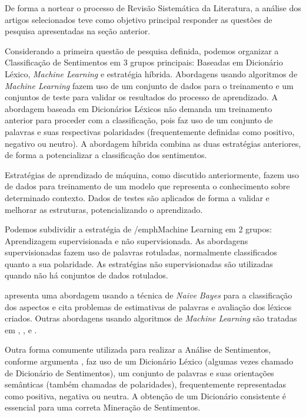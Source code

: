 \documentclass[12pt]{article}
\begin{document}
De forma a nortear o processo de Revisão Sistemática da Literatura, a análise dos artigos selecionados teve como objetivo principal responder as questões de pesquisa apresentadas na seção anterior. 

Considerando a primeira questão de pesquisa definida, podemos organizar a Classificação de Sentimentos em 3 grupos principais: Baseadas em Dicionário Léxico, \emph{Machine Learning} e estratégia híbrida. Abordagens usando algoritmos de \emph{Machine Learning} fazem uso de um conjunto de dados para o treinamento e um conjuntos de teste para validar os resultados do processo de aprendizado. A abordagem baseada em Dicionários Léxicos não demanda um treinamento anterior para proceder com a classificação, pois faz uso de um conjunto de palavras e suas respectivas polaridades (frequentemente definidas como positivo, negativo ou neutro). A abordagem híbrida combina as duas estratégias anteriores, de forma a potencializar a classificação dos sentimentos.

Estratégias de aprendizado de máquina, como discutido anteriormente, fazem uso de dados para treinamento de um modelo que representa o conhecimento sobre determinado contexto. Dados de testes são aplicados de forma a validar e melhorar as estruturas, potencializando o aprendizado. 

Podemos subdividir a estratégia de /emph{Machine Learning} em 2 grupos: Aprendizagem supervisionada e não supervisionada. As abordagens supervisionadas fazem uso de palavras rotuladas, normalmente classificados quanto a sua polaridade. As estratégias não supervisionadas são utilizadas quando não há conjuntos de dados rotulados.

\cite{eisenstein2016unsupervised} apresenta uma abordagem usando a técnica de \emph{Naive Bayes} para a classificação dos aspectos e cita problemas de estimativas de palavras e avaliação dos léxicos criados. Outras abordagens usando algoritmos de \emph{Machine Learning} são tratadas em \cite{gilbert2014vader}, \cite{HADDI2013}, \cite{ALGAAL} e \cite{taboada2011lexicon}.

Outra forma comumente utilizada para realizar a Análise de Sentimentos, conforme argumenta \cite{kdir16}, faz uso de um Dicionário Léxico (algumas vezes chamado de Dicionário de Sentimentos), um conjunto de palavras e suas orientações semânticas (também chamadas de polaridades), frequentemente representadas como positiva, negativa ou neutra. A obtenção de um Dicionário consistente é essencial para uma correta Mineração de Sentimentos. 
\end{document}
